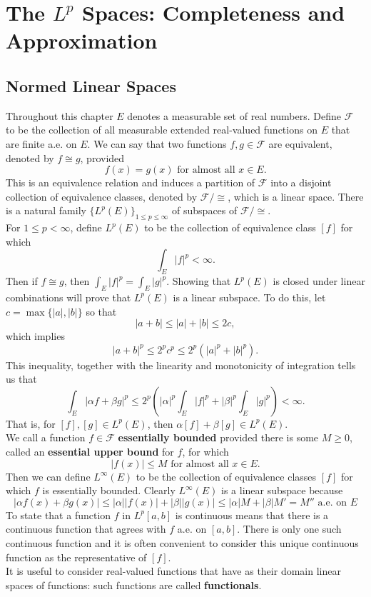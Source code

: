 \chapter{The $L^p$ Spaces: Completeness and Approximation}

\section{Normed Linear Spaces}
\begin{flushleft}
	
	Throughout this chapter $E$ denotes a measurable set of real numbers.
	Define $\mathcal{F}$ to be the collection of all measurable extended real-valued functions on $E$ that are finite a.e. on $E$.
	We can say that two functions $f,g\in\mathcal{F}$ are equivalent, denoted by $f\cong g$, provided
	\[
	f(x)=g(x)\text{ for almost all }x\in E.	
	\]
	This is an equivalence relation and induces a partition of $\mathcal{F}$ into a disjoint collection of equivalence classes, denoted by $\mathcal{F}/\cong$, which is a linear space.
	There is a natural family $\{L^p(E)\}_{1\le p\le\infty}$ of subspaces of $\mathcal{F}/\cong$.
	\\
	For $1\le p<\infty$, define $L^p(E)$ to be the collection of equivalence class $[f]$ for which 
	\[
	\int_E|f|^p<\infty.	
	\]
	Then if $f\cong g$, then $\int_E|f|^p=\int_E|g|^p$.
	Showing that $L^p(E)$ is closed under linear combinations will prove that $L^p(E)$ is a linear subspace.
	To do this, let $c=\max\{|a|,|b|\}$ so that
	\[
	|a+b|\le|a|+|b|\le 2c,
	\]
	which implies
	\[
	|a+b|^p\le 2^pc^p\le2^p(|a|^p+|b|^p).	
	\]
	This inequality, together with the linearity and monotonicity of integration tells us that 
	\[
		\int_E|\alpha f+\beta g|^p \le 2^p(|\alpha|^p\int_E|f|^p+|\beta|^p\int_E| g|^p)<\infty.
	\]
	That is, for $[f],[g]\in L^p(E)$, then $\alpha[f]+\beta[g]\in L^p(E)$.\\
	We call a function $f\in\mathcal{F}$ \textbf{essentially bounded} provided there is some $M\ge 0$, called an \textbf{essential upper bound} for $f$, for which
	\[
	|f(x)|\le M\text{ for almost all }x\in E.	
	\]
	Then we can define $L^\infty(E)$ to be the collection of equivalence classes $[f]$ for which $f$ is essentially bounded. 
	Clearly $L^\infty(E)$ is a linear subspace because
	\[
	|\alpha f(x)+\beta g(x)|\le|\alpha| |f(x)|+|\beta|| g(x)|\le |\alpha| M + |\beta|M' = M'' \text{ a.e. on $E$}
	\]
	To state that a function $f$ in $L^p[a,b]$ is continuous means that there is a continuous function that agrees with $f$ a.e. on $[a,b]$.
	There is only one such continuous function and it is often convenient to consider this unique continuous function as the representative of $[f]$.\\
	It is useful to consider real-valued functions that have as their domain linear spaces of functions: such functions are called \textbf{functionals}.


\end{flushleft}
